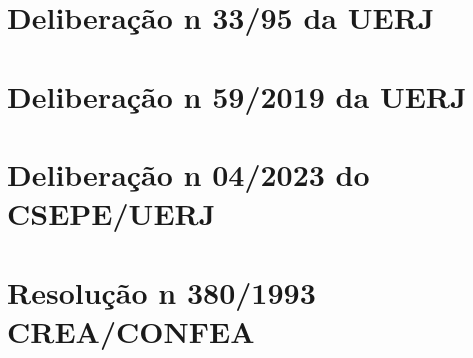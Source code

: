 \documentclass[oneside,envcountsame,envcountchap,openany]{svmono}
\begin{document}
\chapter{Deliberação n\textordmasculine{} 33/95 da UERJ}
\label{delib3395}

\chapter{Deliberação n\textordmasculine{} 59/2019 da UERJ}
\label{delib592019}

\chapter{Deliberação n\textordmasculine{} 04/2023 do CSEPE/UERJ}
\label{del4}

\chapter{Resolução n\textordmasculine{} 380/1993 CREA/CONFEA}
\label{confea1993}

\end{document}

